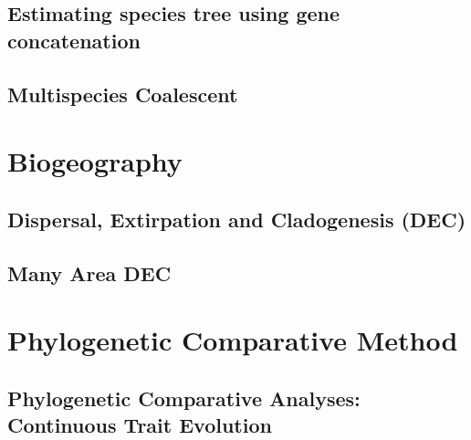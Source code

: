 \documentclass[11pt]{book}
\begin{document}
\chapter{Estimating species tree using gene concatenation}
\def \ResourcePath {RB_GeneConcatenation_Tutorial/}


\chapter{Multispecies Coalescent}
\def \ResourcePath {RB_MultispeciesCoalescent_Tutorial/}







\part{Biogeography}

\chapter{Dispersal, Extirpation and Cladogenesis (DEC)}
\def \ResourcePath {RB_Biogeography_DEC_Tutorial/}


\chapter{Many Area DEC}
\def \ResourcePath {RB_Biogeography_many_area_Tutorial/}








\part{Phylogenetic Comparative Method}
\chapter{Phylogenetic Comparative Analyses: Continuous Trait Evolution}
\def \ResourcePath {RB_PhyloComparative_Tutorial/}

\end{document}
